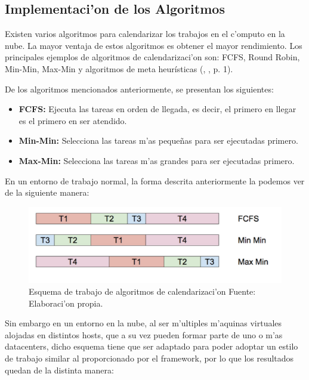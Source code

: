 \subsection{Implementaci'on de los Algoritmos}

Existen varios algoritmos para calendarizar los trabajos en el c'omputo en la nube. La mayor ventaja de estos algoritmos es obtener el mayor rendimiento. Los principales ejemplos de algoritmos de calendarizaci'on son: FCFS, Round Robin, Min-Min, Max-Min y algoritmos de meta heurísticas  (\citeauthor{shimpy2014different}, \citeyear{shimpy2014different}, p. 1).



De los algoritmos mencionados anteriormente, se presentan los siguientes:


\begin{itemize}
	\item  \textbf{FCFS:} Ejecuta las tareas en orden de llegada, es decir, el primero en llegar es el primero en ser atendido.
	\item  \textbf{Min-Min:} Selecciona las tareas m'as pequeñas para ser ejecutadas primero.
	\item  \textbf{Max-Min:} Selecciona las tareas m'as grandes para ser ejecutadas primero.
\end{itemize}

En un entorno de trabajo normal, la forma descrita anteriormente la podemos ver de la siguiente manera:

\begin{figure}
	\caption{Esquema de trabajo de algoritmos de calendarizaci'on
		Fuente: Elaboraci'on propia.}
	\centering
	\includegraphics[scale=0.5]{media/imagendos}
\end{figure}


\newpage
Sin embargo en un entorno en la nube, al ser m'ultiples m'aquinas virtuales alojadas en distintos hosts, que a su vez pueden formar parte de uno o m'as datacenters, dicho esquema tiene que ser adaptado para poder adoptar un estilo de trabajo similar al proporcionado por el framework, por lo que los resultados quedan de la distinta manera:

